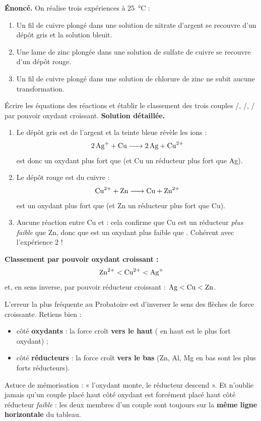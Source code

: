 \documentclass[11pt]{article}
\begin{document}
\begin{exoresolu}
\textbf{Énoncé.} On réalise trois expériences à \SI{25}{\celsius} :
\begin{enumerate}
\item Un fil de cuivre plongé dans une solution de nitrate d'argent se recouvre d'un dépôt gris et la solution bleuit.
\item Une lame de zinc plongée dans une solution de sulfate de cuivre se recouvre d'un dépôt rouge.
\item Un fil de cuivre plongé dans une solution de chlorure de zinc ne subit aucune transformation.
\end{enumerate}
Écrire les équations des réactions et établir le classement des trois couples /, /, / par pouvoir oxydant croissant.
\tcblower
\textbf{Solution détaillée.}
\begin{enumerate}
\item Le dépôt gris est de l'argent et la teinte bleue révèle les ions  :
\[ \ce{2Ag+ + Cu -> 2Ag + Cu^2+} \]
 est donc un oxydant plus fort que  (et Cu un réducteur plus fort que Ag).
\item Le dépôt rouge est du cuivre :
\[ \ce{Cu^2+ + Zn -> Cu + Zn^2+} \]
 est un oxydant plus fort que  (et Zn un réducteur plus fort que Cu).
\item Aucune réaction entre Cu et  : cela confirme que Cu est un réducteur \emph{plus faible} que Zn, donc que  est un oxydant plus faible que . Cohérent avec l'expérience 2 !
\end{enumerate}
\textbf{Classement par pouvoir oxydant croissant :}
\[ \ce{Zn^2+} < \ce{Cu^2+} < \ce{Ag+} \]
et, en sens inverse, par pouvoir réducteur croissant : $\ce{Ag} < \ce{Cu} < \ce{Zn}$.
\end{exoresolu}

\begin{attention}
L'erreur la plus fréquente au Probatoire est d'inverser le sens des flèches de force croissante. Retiens bien :
\begin{itemize}
\item côté \textbf{oxydants} : la force croît \textbf{vers le haut} ( en haut est le plus fort oxydant) ;
\item côté \textbf{réducteurs} : la force croît \textbf{vers le bas} (Zn, Al, Mg en bas sont les plus forts réducteurs).
\end{itemize}
Astuce de mémorisation : « l'oxydant monte, le réducteur descend ». Et n'oublie jamais qu'un couple placé haut côté oxydant est forcément placé haut côté réducteur \emph{faible} : les deux membres d'un couple sont toujours sur la \textbf{même ligne horizontale} du tableau.
\end{attention}
\end{document}
